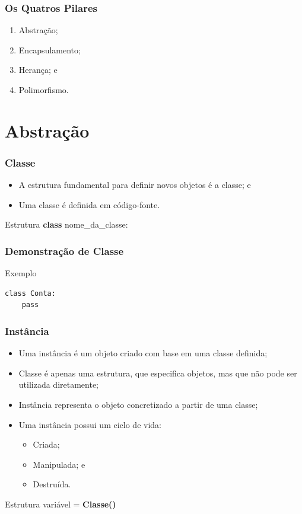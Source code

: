 \documentclass{beamer}
\begin{document}
\begin{frame}
	\frametitle{Os Quatros Pilares}
	
	\begin{enumerate}
	   \item Abstração;
	   \item Encapsulamento;
	   \item Herança; e
	  \item Polimorfismo.
	\end{enumerate}
\end{frame}

\section{Abstração}

\begin{frame}
	\frametitle{Classe}
	
	\begin{itemize}
	  \item A estrutura fundamental para definir novos objetos é a classe; e
	  \item Uma classe é definida em código-fonte.
	\end{itemize} \vfill
	
	\begin{block}{Estrutura}
	\textbf{class} nome\_da\_classe:
	\end{block}
\end{frame}

\begin{frame}[fragile]
	\frametitle{Demonstração de Classe}
	
	\begin{exampleblock}{Exemplo}
		\begin{lstlisting}
class Conta:		
    pass
		\end{lstlisting}
	\end{exampleblock}
\end{frame}

\begin{frame}
	\frametitle{Instância}
	
	\begin{itemize}
	  \item Uma instância é um objeto criado com base em uma classe definida;
	  \item Classe é apenas uma estrutura, que especifica objetos, mas que não
	  pode ser utilizada diretamente;
	  \item Instância representa o objeto concretizado a partir de uma classe;
	  \item Uma instância possui um ciclo de vida:
	  \begin{itemize}
	    \item Criada;
	    \item Manipulada; e
	    \item Destruída. 
	  \end{itemize}
	\end{itemize} \vfill
	
	\begin{block}{Estrutura}
		variável = \textbf{Classe()}
	\end{block}
\end{frame}
\end{document}
